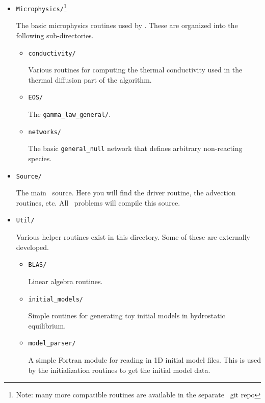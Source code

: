 \begin{itemize}
\begin{itemize}
\begin{itemize}
    \end{itemize}

  \item {\tt Microphysics/}\footnote{Note: many more compatible routines are available in the separate \microphysics\ git repo}

    The basic microphysics routines used by \maestro.  These are organized
    into the following sub-directories.

    \begin{itemize}
    \item {\tt conductivity/}

      Various routines for computing the thermal conductivity used in
      the thermal diffusion part of the algorithm.

    \item {\tt EOS/}

      The {\tt gamma\_law\_general/}.

    \item {\tt networks/}

      The basic {\tt general\_null} network that defines arbitrary
      non-reacting species.

    \end{itemize}


  \item {\tt Source/}

    The main \maestro\ source.  Here you will find the driver routine,
    the advection routines, etc.  All \maestro\ problems will compile
    this source.


  \item {\tt Util/}

    Various helper routines exist in this directory.  Some of these
    are externally developed.

    \begin{itemize}

    \item {\tt BLAS/}

      Linear algebra routines.

    \item {\tt initial\_models/}

      Simple routines for generating toy initial models in hydrostatic equilibrium.

    \item {\tt model\_parser/}

      A simple Fortran module for reading in 1D initial model files.
      This is used by the initialization routines to get the initial
      model data.


\end{itemize}
\end{itemize}
\end{itemize}
